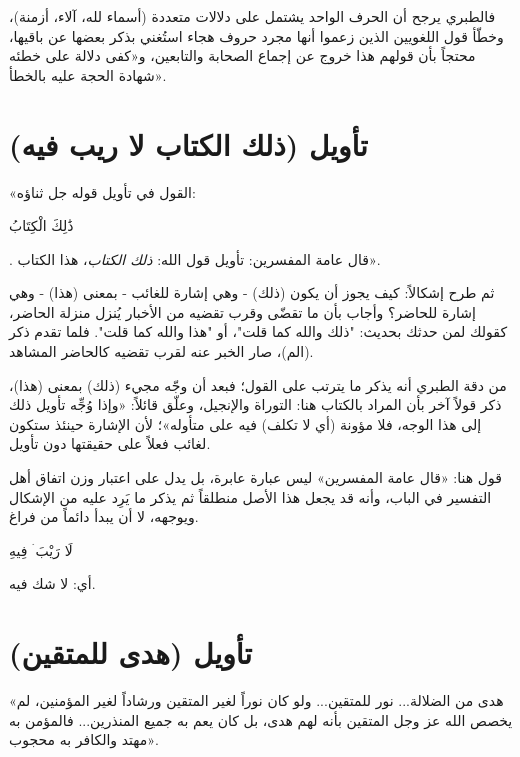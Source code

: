 فالطبري يرجح أن الحرف الواحد يشتمل على دلالات متعددة (أسماء لله، آلاء، أزمنة)، وخطّأ قول اللغويين الذين زعموا أنها مجرد حروف هجاء استُغني بذكر بعضها عن باقيها، محتجاً بأن قولهم هذا خروج عن إجماع الصحابة والتابعين، و«كفى دلالة على خطئه شهادة الحجة عليه بالخطأ».

\separator

\section{تأويل (ذلك الكتاب لا ريب فيه)}
 «القول في تأويل قوله جل ثناؤه: \begin{ayah}ذَٰلِكَ الْكِتَابُ\end{ayah}. قال عامة المفسرين: تأويل قول الله: \textit{ذلك الكتاب}، هذا الكتاب».

ثم طرح إشكالاً: كيف يجوز أن يكون (ذلك) - وهي إشارة للغائب - بمعنى (هذا) - وهي إشارة للحاضر؟
وأجاب بأن ما تقضّى وقرب تقضيه من الأخبار يُنزل منزلة الحاضر، كقولك لمن حدثك بحديث: "ذلك والله كما قلت"، أو "هذا والله كما قلت". فلما تقدم ذكر (الم)، صار الخبر عنه لقرب تقضيه كالحاضر المشاهد.

\begin{fawaid}
من دقة الطبري أنه يذكر ما يترتب على القول؛ فبعد أن وجّه مجيء (ذلك) بمعنى (هذا)، ذكر قولاً آخر بأن المراد بالكتاب هنا: التوراة والإنجيل، وعلّق قائلاً: «وإذا وُجِّه تأويل ذلك إلى هذا الوجه، فلا مؤونة (أي لا تكلف) فيه على متأوله»؛ لأن الإشارة حينئذ ستكون لغائب فعلاً على حقيقتها دون تأويل.
\end{fawaid}

\begin{fawaid}
قول  هنا: «قال عامة المفسرين» ليس عبارة عابرة، بل يدل على اعتبار وزن اتفاق أهل التفسير في الباب، وأنه قد يجعل هذا الأصل منطلقاً ثم يذكر ما يَرِد عليه من الإشكال ويوجهه، لا أن يبدأ دائماً من فراغ.
\end{fawaid}

 \begin{ayah}لَا رَيْبَ ۛ فِيهِ\end{ayah} أي: لا شك فيه.

\separator

\section{تأويل (هدى للمتقين)}
 «هدى من الضلالة... نور للمتقين... ولو كان نوراً لغير المتقين ورشاداً لغير المؤمنين، لم يخصص الله عز وجل المتقين بأنه لهم هدى، بل كان يعم به جميع المنذرين... فالمؤمن به مهتد والكافر به محجوب».

